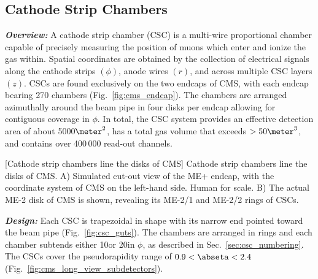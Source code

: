 \subsection{Cathode Strip Chambers}
\label{sec:csc} 
\textit{\textbf{Overview:}}
A cathode strip chamber (CSC) is a multi-wire proportional chamber capable of precisely measuring the position of muons which enter and ionize the gas within.
Spatial coordinates are obtained by the collection of electrical signals along the cathode strips $(\phi)$, anode wires $(r)$, and across multiple CSC layers $(z)$.
CSCs are found exclusively on the two endcaps of CMS, with each endcap bearing 270 chambers (Fig.~\ref{fig:cms_endcap}).
The chambers are arranged azimuthally around the beam pipe in four disks per endcap allowing for contiguous coverage in $\phi$.
In total, the CSC system provides an effective detection area of about 5000$\meter^2$, has a total gas volume that exceeds $> 50\meter^{3}$, and contains over 400\,000 read-out channels.
\begin{multiFigure}
    \centering
        [Cathode strip chambers line the disks of CMS]
        {Cathode strip chambers line the disks of CMS.
        \;A) Simulated cut-out view of the ME+ endcap, with the coordinate system of CMS on the left-hand side.
        Human for scale.
        \;B) The actual ME-2 disk of CMS is shown, revealing its ME-2/1 and ME-2/2 rings of CSCs.
        }
    \label{fig:cms_endcap}
\end{multiFigure}
\textit{\textbf{Design:}}
Each CSC is trapezoidal in shape with its narrow end pointed toward the beam pipe (Fig.~\ref{fig:csc_guts}).
The chambers are arranged in rings and each chamber subtends either 10\degrees or 20\degrees in $\phi$, as described in Sec.~\ref{sec:csc_numbering}.
The CSCs cover the pseudorapidity range of $0.9 < \abseta < 2.4$ (Fig.~\ref{fig:cms_long_view_subdetectors}).
